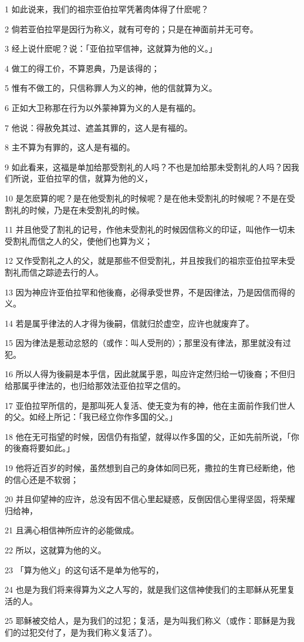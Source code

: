 \par 1 如此说来，我们的祖宗亚伯拉罕凭著肉体得了什麽呢？
\par 2 倘若亚伯拉罕是因行为称义，就有可夸的；只是在神面前并无可夸。
\par 3 经上说什麽呢？说：「亚伯拉罕信神，这就算为他的义。」
\par 4 做工的得工价，不算恩典，乃是该得的；
\par 5 惟有不做工的，只信称罪人为义的神，他的信就算为义。
\par 6 正如大卫称那在行为以外蒙神算为义的人是有福的。
\par 7 他说：得赦免其过、遮盖其罪的，这人是有福的。
\par 8 主不算为有罪的，这人是有福的。
\par 9 如此看来，这福是单加给那受割礼的人吗？不也是加给那未受割礼的人吗？因我们所说，亚伯拉罕的信，就算为他的义，
\par 10 是怎麽算的呢？是在他受割礼的时候呢？是在他未受割礼的时候呢？不是在受割礼的时候，乃是在未受割礼的时候。
\par 11 并且他受了割礼的记号，作他未受割礼的时候因信称义的印证，叫他作一切未受割礼而信之人的父，使他们也算为义；
\par 12 又作受割礼之人的父，就是那些不但受割礼，并且按我们的祖宗亚伯拉罕未受割礼而信之踪迹去行的人。
\par 13 因为神应许亚伯拉罕和他後裔，必得承受世界，不是因律法，乃是因信而得的义。
\par 14 若是属乎律法的人才得为後嗣，信就归於虚空，应许也就废弃了。
\par 15 因为律法是惹动忿怒的（或作：叫人受刑的）；那里没有律法，那里就没有过犯。
\par 16 所以人得为後嗣是本乎信，因此就属乎恩，叫应许定然归给一切後裔；不但归给那属乎律法的，也归给那效法亚伯拉罕之信的。
\par 17 亚伯拉罕所信的，是那叫死人复活、使无变为有的神，他在主面前作我们世人的父。如经上所记：「我已经立你作多国的父。」
\par 18 他在无可指望的时候，因信仍有指望，就得以作多国的父，正如先前所说，「你的後裔将要如此。」
\par 19 他将近百岁的时候，虽然想到自己的身体如同已死，撒拉的生育已经断绝，他的信心还是不软弱；
\par 20 并且仰望神的应许，总没有因不信心里起疑惑，反倒因信心里得坚固，将荣耀归给神，
\par 21 且满心相信神所应许的必能做成。
\par 22 所以，这就算为他的义。
\par 23 「算为他义」的这句话不是单为他写的，
\par 24 也是为我们将来得算为义之人写的，就是我们这信神使我们的主耶稣从死里复活的人。
\par 25 耶稣被交给人，是为我们的过犯；复活，是为叫我们称义（或作：耶稣是为我们的过犯交付了，是为我们称义复活了）。

